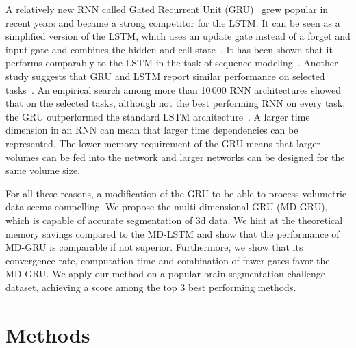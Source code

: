 \documentclass[runningheads,a4paper]{llncs}
\begin{document}
A relatively new RNN called Gated Recurrent Unit (GRU)~\cite{cho_learning_2014} grew popular in recent years and became a strong competitor for the LSTM. It can be seen as a simplified version of the LSTM, which uses an update gate instead of a forget and input gate and combines the hidden and cell state~\cite{olah_understanding_2015}. It has been shown that it performs comparably to the LSTM in the task of sequence modeling~\cite{chung_empirical_2014}. Another study suggests that GRU and LSTM report similar performance on selected tasks~\cite{greff_lstm:_2015}. An empirical search among more than 10\,000 RNN architectures showed that on the selected tasks, although not the best performing RNN on every task, the GRU outperformed the standard LSTM architecture~\cite{jozefowicz_empirical_2015}.
A larger time dimension in an RNN can mean that larger time dependencies can be represented. The lower memory requirement of the GRU means that larger volumes can be fed into the network and larger networks can be designed for the same volume size.

For all these reasons, a modification of the GRU to be able to process volumetric data seems compelling. We propose the multi-dimensional GRU (MD-GRU), which is capable of accurate segmentation of 3d data. We hint at the theoretical memory savings compared to the MD-LSTM and show that the performance of MD-GRU is comparable if not superior. Furthermore, we show that its convergence rate, computation time and combination of fewer gates favor the MD-GRU. We apply our method on a popular brain segmentation challenge dataset, achieving a score among the top 3 best performing methods. 

\section{Methods}
\end{document}

